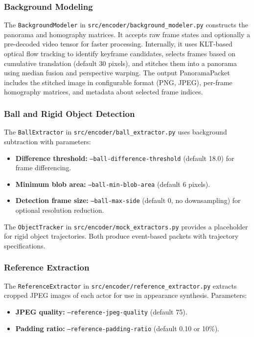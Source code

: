 \documentclass[manuscript, screen]{acmart}
\begin{document}
\subsubsection{Background Modeling}
The \texttt{BackgroundModeler} in \texttt{src/encoder/background\_modeler.py} constructs the panorama and homography matrices. It accepts raw frame states and optionally a pre-decoded video tensor for faster processing. Internally, it uses KLT-based optical flow tracking to identify keyframe candidates, selects frames based on cumulative translation (default 30 pixels), and stitches them into a panorama using median fusion and perspective warping. The output PanoramaPacket includes the stitched image in configurable format (PNG, JPEG), per-frame homography matrices, and metadata about selected frame indices.

\subsubsection{Ball and Rigid Object Detection}
The \texttt{BallExtractor} in \texttt{src/encoder/ball\_extractor.py} uses background subtraction with parameters:
\begin{itemize}[topsep=0pt,itemsep=0pt,leftmargin=*]
    \item \textbf{Difference threshold:} \texttt{--ball-difference-threshold} (default 18.0) for frame differencing.
    \item \textbf{Minimum blob area:} \texttt{--ball-min-blob-area} (default 6 pixels).
    \item \textbf{Detection frame size:} \texttt{--ball-max-side} (default 0, no downsampling) for optional resolution reduction.
\end{itemize}
The \texttt{ObjectTracker} in \texttt{src/encoder/mock\_extractors.py} provides a placeholder for rigid object trajectories. Both produce event-based packets with trajectory specifications.

\subsubsection{Reference Extraction}
The \texttt{ReferenceExtractor} in \texttt{src/encoder/reference\_extractor.py} extracts cropped JPEG images of each actor for use in appearance synthesis. Parameters:
\begin{itemize}[topsep=0pt,itemsep=0pt,leftmargin=*]
    \item \textbf{JPEG quality:} \texttt{--reference-jpeg-quality} (default 75).
    \item \textbf{Padding ratio:} \texttt{--reference-padding-ratio} (default 0.10 or 10\%).
\end{itemize}
\end{document}
